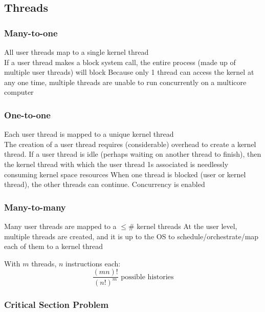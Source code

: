 \documentclass[a4paper]{article}
\begin{document}
\begin{multicols*}{2}
    \subsection*{Threads}
    \subsubsection*{Many-to-one} All user threads map to a single kernel thread \\
    If a user thread makes a block system call, the entire process (made up of
    multiple user threads) will block Because only 1 thread can access the
    kernel at any one time, multiple threads are unable to run concurrently on a
    multicore computer

    \vspace*{-1em}
    \subsubsection*{One-to-one} Each user thread is mapped to a unique kernel thread \\
    The creation of a user thread requires (considerable) overhead to create a
    kernel thread. If a user thread is idle (perhaps waiting on another thread
    to finish), then the kernel thread with which the user thread 1s associated
    is needlessly consuming kernel space resources When one thread is blocked
    (user or kernel thread), the other threads can continue. Concurrency is
    enabled

    \vspace*{-1em}
    \subsubsection*{Many-to-many} Many user threads are mapped to a \(\leq \#\)
    kernel threads At the user level, multiple threads are created, and it is up
    to the OS to schedule/orchestrate/map each of them to a kernel thread

    \begin{multicols*}{2}
        With \(m\) threads, \(n\) instructions each:
        \columnbreak
        \begin{equation*}
            \frac{(mn)!}{(n!)^m} \text{ possible histories}
        \end{equation*}
    \end{multicols*}

    \vspace*{-3em}

    \subsubsection*{Critical Section Problem}


\end{multicols*}
\end{document}
